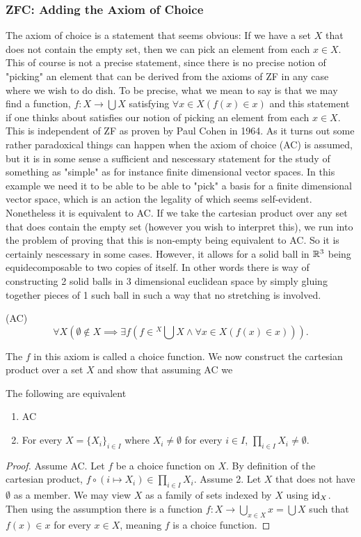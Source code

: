 \subsubsection{ZFC: Adding the Axiom of Choice}
The axiom of choice is a statement that seems obvious: If we have a set $X$ that does not contain the empty set, then we can pick an element from each $x\in X$. This of course is not a precise statement, since there is no precise notion of "picking" an element that can be derived from the axioms of ZF in any case where we wish to do dish. To be precise, what we mean to say is that we may find a function, $f :X \rightarrow \bigcup X$ satisfying $\forall x\in X(f(x)\in x)$ and this statement if one thinks about satisfies our notion of picking an element from each $x\in X$. This is independent of ZF as proven by Paul Cohen in 1964. As it turns out some rather paradoxical things can happen when the axiom of choice (AC) is assumed, but it is in some sense a sufficient and nescessary statement for the study of something as "simple" as for instance finite dimensional vector spaces. In this example we need it to be able to be able to "pick" a basis for a finite dimensional vector space, which is an action the legality of which seems self-evident. Nonetheless it is equivalent to AC. If we take the cartesian product over any set that does contain the empty set (however you wish to interpret this), we run into the problem of proving that this is non-empty being equivalent to AC. So it is certainly nescessary in some cases. However, it allows for a solid ball in $\mathbb{R}^3$ being equidecomposable to two copies of itself. In other words there is way of constructing 2 solid balls in 3 dimensional euclidean space by simply gluing together pieces of 1 such ball in such a way that no stretching is involved.   
\begin{axioms}(AC)
    $$\forall X\left(\emptyset\notin X \implies \exists f\left(f\in {}^{X}\!\bigcup X\wedge \forall x\in X(f(x)\in x)\right)\right).$$
\end{axioms}
The $f$ in this axiom is called a choice function. 
We now construct the cartesian product over a set $X$ and show that assuming AC we 
\begin{theorem}
    The following are equivalent
    \begin{enumerate}
        \item AC
        \item For every $X=\{X_i\}_{i\in I}$ where $X_i\neq \emptyset$ for every $i\in I$, $\prod_{i\in I} X_i\neq \emptyset$. 
    \end{enumerate}
\end{theorem}
\begin{proof}
    Assume AC. Let $f$ be a choice function on $X$. By definition of the cartesian product, $f\circ (i\mapsto X_i)\in \prod_{i\in I} X_i$.  
    Assume 2. Let $X$ that does not have $\emptyset$ as a member. We may view $X$ as a family of sets indexed by $X$ using $\mathrm{id}_X$. Then using the assumption there is a function $f : X\rightarrow \bigcup_{x\in X} x = \bigcup X$ such that $f(x)\in x$ for every $x\in X$, meaning $f$ is a choice function.
\end{proof}
